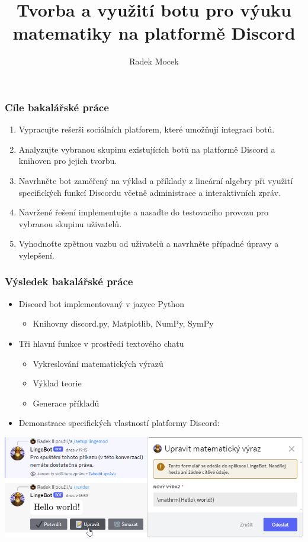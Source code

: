 \documentclass[FM]{tulpresentation}
\title{Tvorba a využití botu pro výuku matematiky na platformě Discord}
\author{Radek Mocek}
\institute{Ing. Igor Kopetschke}
\begin{document}
	\TULtitleframe
	
	\begin{frame}\frametitle{Cíle bakalářské práce}
		\begin{enumerate}
			\item Vypracujte rešerši sociálních platforem, které umožňují integraci botů.
			\item Analyzujte vybranou skupinu existujících botů na platformě Discord a knihoven pro jejich tvorbu.
			\item Navrhněte bot zaměřený na výklad a příklady z lineární algebry při využití specifických funkcí Discordu včetně administrace a interaktivních zpráv.
			\item Navržené řešení implementujte a nasaďte do testovacího provozu pro vybranou skupinu uživatelů.
			\item Vyhodnoťte zpětnou vazbu od uživatelů a navrhněte případné úpravy a vylepšení.
		\end{enumerate}
	\end{frame}
	
	\begin{frame}\frametitle{Výsledek bakalářské práce}
		\begin{itemize}
			\item Discord bot implementovaný v jazyce Python
			\begin{itemize}
				\item Knihovny discord.py, Matplotlib, NumPy, SymPy
			\end{itemize}
			\item Tři hlavní funkce v prostředí textového chatu
			\begin{itemize}
				\item Vykreslování matematických výrazů
				\item Výklad teorie
				\item Generace příkladů
			\end{itemize}
			\item Demonstrace specifických vlastností platformy Discord:			
		\end{itemize}
		\includegraphics[width=.95\paperwidth]{img/idk}
	\end{frame}
	
\end{document}
